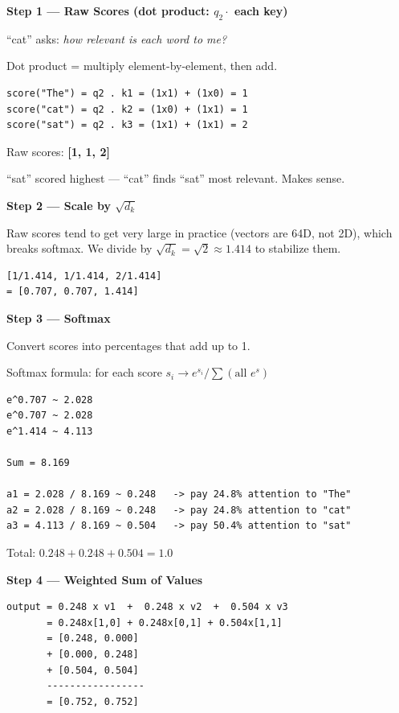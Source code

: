\medskip
\textbf{Step 1 --- Raw Scores (dot product: $q_2 \cdot$ each key)}

``cat'' asks: \textit{how relevant is each word to me?}

Dot product = multiply element-by-element, then add.

\begin{verbatim}
score("The") = q2 . k1 = (1x1) + (1x0) = 1
score("cat") = q2 . k2 = (1x0) + (1x1) = 1
score("sat") = q2 . k3 = (1x1) + (1x1) = 2
\end{verbatim}

Raw scores: \textbf{[1, 1, 2]}

``sat'' scored highest --- ``cat'' finds ``sat'' most relevant. Makes sense.

\medskip
\textbf{Step 2 --- Scale by $\sqrt{d_k}$}

Raw scores tend to get very large in practice (vectors are 64D, not 2D), which breaks softmax. We divide by $\sqrt{d_k} = \sqrt{2} \approx 1.414$ to stabilize them.

\begin{verbatim}
[1/1.414, 1/1.414, 2/1.414]
= [0.707, 0.707, 1.414]
\end{verbatim}

\medskip
\textbf{Step 3 --- Softmax}

Convert scores into percentages that add up to 1.

Softmax formula: for each score $s_i \to e^{s_i} / \sum(\text{all } e^s)$

\begin{verbatim}
e^0.707 ~ 2.028
e^0.707 ~ 2.028
e^1.414 ~ 4.113

Sum = 8.169

a1 = 2.028 / 8.169 ~ 0.248   -> pay 24.8% attention to "The"
a2 = 2.028 / 8.169 ~ 0.248   -> pay 24.8% attention to "cat"
a3 = 4.113 / 8.169 ~ 0.504   -> pay 50.4% attention to "sat"
\end{verbatim}

Total: $0.248 + 0.248 + 0.504 = 1.0$ \checkmark

\medskip
\textbf{Step 4 --- Weighted Sum of Values}

\begin{verbatim}
output = 0.248 x v1  +  0.248 x v2  +  0.504 x v3
       = 0.248x[1,0] + 0.248x[0,1] + 0.504x[1,1]
       = [0.248, 0.000]
       + [0.000, 0.248]
       + [0.504, 0.504]
       -----------------
       = [0.752, 0.752]
\end{verbatim}

